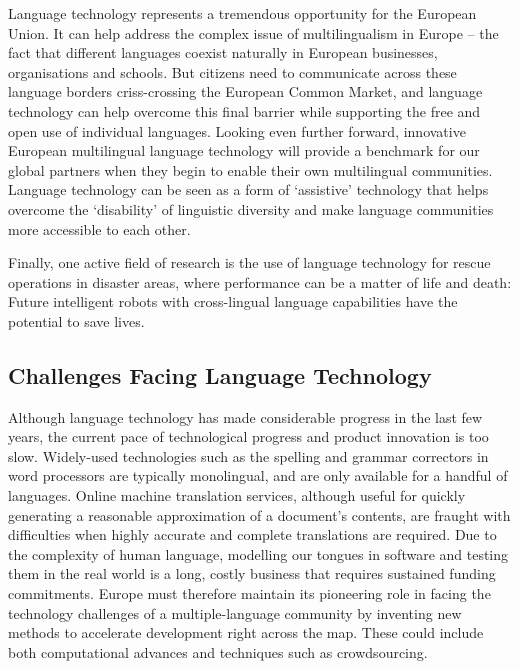 \begin{multicols}{2}
Language technology represents a tremendous opportunity for the European Union. It can help address the complex issue of multilingualism in Europe – the fact that different languages coexist naturally in European businesses, organisations and schools. But citizens need to communicate across these language borders criss-crossing the European Common Market, and language technology can help overcome this final barrier while supporting the free and open use of individual languages. Looking even further forward, innovative European multilingual language technology will provide a benchmark for our global partners when they begin to enable their own multilingual communities. Language technology can be seen as a form of ‘assistive’ technology that helps overcome the ‘disability’ of linguistic diversity and make language communities more accessible to each other.

Finally, one active field of research is the use of language technology for rescue operations in disaster areas, where performance can be a matter of life and death: Future intelligent robots with cross-lingual language capabilities have the potential to save lives.

\subsection{Challenges Facing Language Technology}

Although language technology has made considerable progress in the last few years, the current pace of technological progress and product innovation is too slow. Widely-used technologies such as the spelling and grammar correctors in word processors are typically monolingual, and are only available for a handful of languages. Online machine translation services, although useful for quickly generating a reasonable approximation of a document’s contents, are fraught with difficulties when highly accurate and complete translations are required. Due to the complexity of human language, modelling our tongues in software and testing them in the real world is a long, costly business that requires sustained funding commitments. Europe must therefore maintain its pioneering role in facing the technology challenges of a multiple-language community by inventing new methods to accelerate development right across the map. These could include both computational advances and techniques such as crowdsourcing.



\end{multicols}
